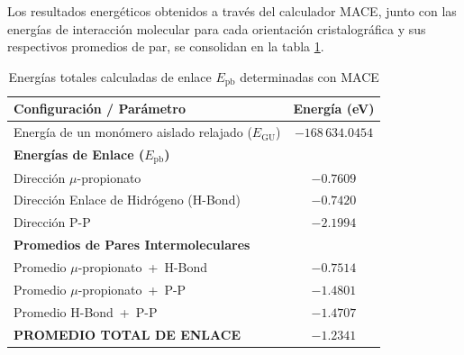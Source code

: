\documentclass[12pt]{article}
\begin{document}
Los resultados energéticos obtenidos a través del calculador MACE, junto con las energías de interacción molecular para cada orientación cristalográfica y sus respectivos promedios de par, se consolidan en la tabla \ref{tab:energias_hemozoin}.

\begin{table}[htbp]
    \centering
    \caption{Energías totales calculadas de enlace $E_{\text{pb}}$ determinadas con MACE}
    \label{tab:energias_hemozoin}
    \small
    \begin{tabular}{lc}
        \hline
        \textbf{Configuración / Parámetro} & \textbf{Energía (eV)} \\ \hline
        Energía de un monómero aislado relajado ($E_{\text{GU}}$) & $-168\,634.0454$ \\ [1ex]
        \textbf{Energías de Enlace ($E_{\text{pb}}$)} & \\
        \quad Dirección $\mu$-propionato & $-0.7609$ \\
        \quad Dirección Enlace de Hidrógeno (H-Bond) & $-0.7420$ \\
        \quad Dirección P-P & $-2.1994$ \\ [1ex]
        \textbf{Promedios de Pares Intermoleculares} & \\
        \quad Promedio $\mu$-propionato \,+\, H-Bond & $-0.7514$ \\
        \quad Promedio $\mu$-propionato \,+\, P-P & $-1.4801$ \\
        \quad Promedio H-Bond \,+\, P-P & $-1.4707$ \\ [1ex]
        \hline
        \textbf{PROMEDIO TOTAL DE ENLACE} & $\mathbf{-1.2341}$ \\ \hline
    \end{tabular}
\end{table}

\printbibliography
\end{document}
